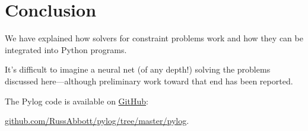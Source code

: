 



\section{Conclusion} \label{sec:conclusion}

We have explained how solvers for constraint problems work and how they can be integrated into Python programs. 

It's difficult to imagine a neural net (of any depth!) solving the problems discussed here---although preliminary work toward that end has been reported. \cite{xu2018towards, amel2019shallow, dubois2019towards}

The Pylog code is available on \href{https://github.com/RussAbbott/pylog/tree/master/pylog}{GitHub}:

\href{https://github.com/RussAbbott/pylog/tree/master/pylog}{github.com/RussAbbott/pylog/tree/master/pylog}.

